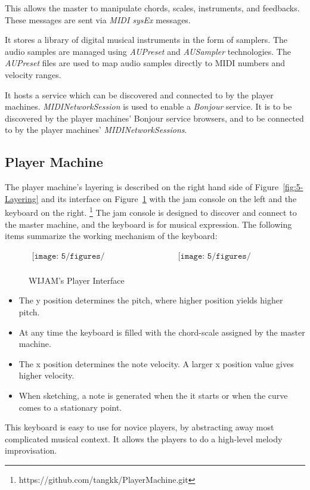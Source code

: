 This allows the master to manipulate chords, scales, instruments, and feedbacks. These messages are sent via \textit{MIDI sysEx} messages.

It stores a library of digital musical instruments in the form of samplers. The audio samples are managed using \textit{AUPreset} and \textit{AUSampler} technologies\cite{AUSampler}. The \textit{AUPreset} files are used to map audio samples directly to MIDI numbers and velocity ranges.

It hosts a service which can be discovered and connected to by the player machines. \textit{MIDINetworkSession} is used to enable a \textit{Bonjour} service. It is to be discovered by the player machines' Bonjour service browsers, and to be connected to by the player machines' \textit{MIDINetworkSessions}.

\subsection{Player Machine}
The player machine's layering is described on the right hand side of Figure~\ref{fig:5-Layering} and its interface on Figure~\ref{fig:5-PlayerMachineVC} with the jam console on the left and the keyboard on the right. \footnote{https://github.com/tangkk/PlayerMachine.git} The jam console is designed to discover and connect to the master machine, and the keyboard is for musical expression. The following items summarize the working mechanism of the keyboard:
\begin{figure}[htbp]
\begin{center}$
\begin{array}{cc}
\texttt{[image: 5/figures/PlayerMachineVC.png]} &
\texttt{[image: 5/figures/Simple.png]} \\
\end{array}$
\end{center}
\caption{WIJAM's Player Interface}
\label{fig:5-PlayerMachineVC}
\end{figure}
\begin{itemize}
\item
The y position determines the pitch, where higher position yields higher pitch.
\item
At any time the keyboard is filled with the chord-scale assigned by the master machine.
\item
The x position determines the note velocity. A larger x position value gives higher velocity.
\item
When sketching, a note is generated when the it starts or when the curve comes to a stationary point.
\end{itemize}
This keyboard is easy to use for novice players, by abstracting away most complicated musical context. It allows the players to do a high-level melody improvisation.


